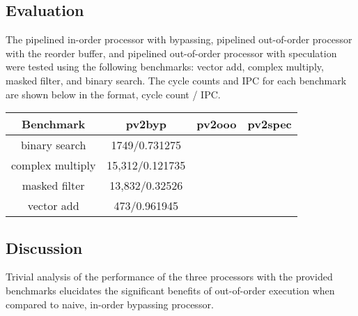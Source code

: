 \documentclass[11pt]{article}
\begin{document}
\subsection*{Evaluation}

The pipelined in-order processor with bypassing, pipelined out-of-order processor with the reorder buffer, 
and pipelined out-of-order processor with speculation were tested using the following
benchmarks: vector add, complex multiply, masked filter, and binary search. The
cycle counts and IPC for each benchmark are shown below in the format, cycle
count / IPC.

\begin{center}
    \begin{tabular}{|c || c | c | c|} 
 \hline
 Benchmark & pv2byp & pv2ooo & pv2spec \\
 \hline
 \hline
 binary search & 1749/0.731275 & &  \\
 \hline
 complex multiply & 15,312/0.121735 &  &  \\
 \hline
 masked filter & 13,832/0.32526 & &  \\
 \hline
 vector add & 473/0.961945 & & \\
 \hline

\end{tabular}
\end{center}

\subsection*{Discussion}


Trivial analysis of the performance of the three processors with the provided benchmarks elucidates
the significant benefits of out-of-order execution when compared to naive, in-order bypassing processor.


%
\end{document}
